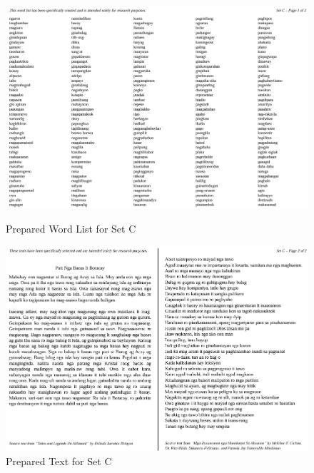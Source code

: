 \begin{figure}[h!]
	\centering
	\includegraphics[width=\textwidth]{./appendix/setC1.png}
	\caption{Prepared Word List for Set C}
	\includegraphics[width=\textwidth]{./appendix/setC2.png}
	\caption{Prepared Text for Set C}
	\label{fig:setC}
\end{figure}

